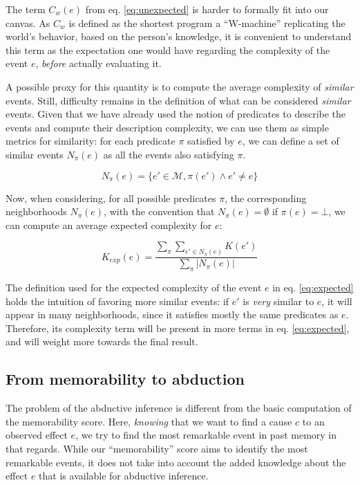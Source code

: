 \documentclass[conference]{IEEEtran}
\begin{document}
The term $C_{w}(e)$ from eq. \ref{eq:unexpected} is harder to formally
fit into our canvas. As $C_{w}$ is defined as the shortest program a
``W-machine'' replicating the world's behavior, based on the person's
knowledge\cite{dessalles2011coincidences}, it is convenient to understand this
term as the expectation one would have regarding the complexity of the event
$e$, \emph{before} actually evaluating it.

A possible proxy for this quantity is to compute the average complexity
of \emph{similar} events. Still, difficulty remains in the definition of what
can be considered \emph{similar} events. Given that we have already used the
notion of predicates to describe the events and compute their description
complexity, we can use them as simple metrics for similarity: for each predicate
$\pi$ satisfied by $e$, we can define a set of similar events $N_{\pi}(e)$ as
all the events also satisfying $\pi$.

\begin{equation}
\label{eq:similar}
N_{\pi}(e) = \{e'\in \mathcal{M}, \pi(e') \wedge e' \neq e\}
\end{equation}

Now, when considering, for all possible predicates $\pi$, the corresponding
neighborhoods $N_{\pi}(e)$, with the convention that $N_{\pi}(e) = \emptyset$
if $\pi(e) = \bot$, we can compute an average expected complexity for $e$:

\begin{equation}
\label{eq:expected}
K_{exp}(e) = \frac{
                    \sum_{\pi} \sum_{e' \in N_{\pi}(e)} K(e')
                  }{
                    \sum_{\pi} |N_{\pi}(e)|
                  }
\end{equation}

The definition used for the expected complexity of the event $e$ in eq.
\ref{eq:expected} holds the intuition of favoring more similar events: if $e'$
is \emph{very} similar to $e$, it will appear in many neighborhoods, since it
satisfies mostly the same predicates as $e$. Therefore, its complexity term will
be present in more terms in eq. \ref{eq:expected}, and will weight more towards
the final result.

\subsection{From memorability to abduction}
The problem of the abductive inference is different from the basic computation
of the memorability score. Here, \emph{knowing} that we want to find a cause $c$
to an observed effect $e$, we try to find the most remarkable event in past
memory in that regards. While our ``memorability'' score aims to identify the
most remarkable events, it does not take into account the added knowledge about
the effect $e$ that is available for abductive inference.
\end{document}
